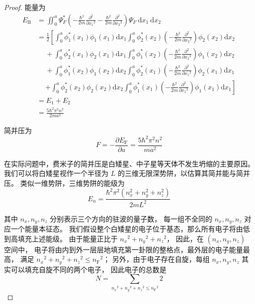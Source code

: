\begin{proof}
能量为
$$\begin{aligned}
E_{\mathrm{B}}& = \iint_{0}^{a} \Psi_{F}^{*}\left(-\frac{\hbar^{2}}{2m} \frac{\partial^{2}}{\partial x_{1}{ }^{2}}-\frac{\hbar^{2}}{2m} \frac{\partial^{2}}{\partial x_{2}{ }^{2}}\right) \Psi_{F} \mathrm{~d} x_{1} \mathrm{~d} x_{2} \\
& = \frac{1}{2}\left[\int_{0}^{a} \phi_{1}^{*}(x_{1}) \phi_{1}(x_{1}) \mathrm{d} x_{1} \int_{0}^{a} \phi_{2}^{*}(x_{2})\left(-\frac{\hbar^{2}}{2m} \frac{\partial^{2}}{\partial x_{2}{ }^{2}}\right) \phi_{2}(x_{2}) \mathrm{d} x_{2}\right. \\
& \quad\ +\int_{0}^{a} \phi_{2}^{*}(x_{1}) \phi_{2}(x_{1}) \mathrm{d} x_{1} \int_{0}^{a} \phi_{1}^{*}(x_{2})\left(-\frac{\hbar^{2}}{2m} \frac{\partial^{2}}{\partial x_{2}{ }^{2}}\right) \phi_{1}(x_{2}) \mathrm{d} x_{2} \\
& \quad\ +\int_{0}^{a} \phi_{1}^{*}(x_{2}) \phi_{1}(x_{2}) \mathrm{d} x_{2} \int_{0}^{a} \phi_{2}^{*}(x_{1})\left(-\frac{\hbar^{2}}{2m} \frac{\partial^{2}}{\partial x_{1}{ }^{2}}\right) \phi_{2}(x_{1}) \mathrm{d} x_{1} \\
& \quad\ \left.+\int_{0}^{a} \phi_{2}^{*}(x_{2}) \phi_{2}(x_{2}) \mathrm{d} x_{2} \int_{0}^{a} \phi_{1}^{*}(x_{1})\left(-\frac{\hbar^{2}}{2m} \frac{\partial^{2}}{\partial x_{1}{ }^{2}}\right) \phi_{1}(x_{1}) \mathrm{d} x_{1}\right] \\
& = E_{1}+E_{2} \\
& = \frac{5 \hbar^{2} \pi^{2} n^{2}}{2ma^{2}}
\end{aligned}$$

简并压为
$$F=-\frac{\partial E_{\mathrm{F}}}{\partial a}
=\frac{5 \hbar^{2} \pi^{2} n^{2}}{m a^{2}}$$

在实际问题中，费米子的简并压是白矮星、中子星等天体不发生坍缩的主要原因。
我们可以将白矮星视作一个半径为 $L$ 的三维无限深势阱，以估算其简并能与简并压。
类似一维势阱，三维势阱的能级为
$$E_{n}=\frac{\hbar^{2} \pi^{2}\left(n_{x}^{2}+n_{y}^{2}+n_{z}^{2}\right)}{2mL^{2}}$$

其中 $n_{x}, n_{y}, n_{z}$ 分别表示三个方向的驻波的量子数，
每一组不全同的 $n_{x}, n_{y}, n_{z}$ 对应一个能量本征态。
我们假设整个白矮星的电子位于基态，那么所有电子将由低到高填充上述能级。
由于能量正比于 $n_{x}{ }^{2}+n_{y}{ }^{2}+n_{z}{ }^{2}$，
因此，在 $\left(n_{x}, n_{y}, n_{z}\right)$ 空间中，
电子将由内到外一层层地填充第一卦限的整格点，最外层的电子能量最高，
满足 $n_{x}{ }^{2}+n_{y}{ }^{2}+n_{z}{ }^{2} \leq n_{\mathrm{F}}{ }^{2}$；
另外，由于电子存在自旋，每组 $n_{x}, n_{y}, n_{z}$ 其实可以填充自旋不同的两个电子，
因此电子的总数是
$$N=\sum_{n_{x}{ }^{2}+n_{y}{ }^{2}+n_{z}{ }^{2} \leq n_{\mathrm{F}}{ }^{2}} 2$$


\end{proof}
